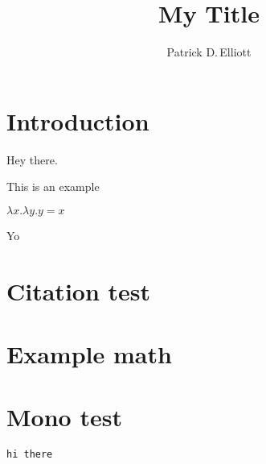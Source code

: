 \documentclass[parskip=half]{ling-handout}
\title{My Title}
\author{Patrick D.\,Elliott}
\begin{document}
\maketitle

\section{Introduction}

\kant[1-2]


\begin{addmargin}[0pt]{.3\textwidth}

Hey there.


\kant[3]

\end{addmargin}

\syncwithnotecolumns[paragraphs]

\ex
This is an example
\xe

\ex
\(λ x . λ y . y = x\)
\xe

Yo

\section{Citation test}

\section{Example math}

\section{Mono test}

\texttt{hi there}

\printbibliography
\end{document}
